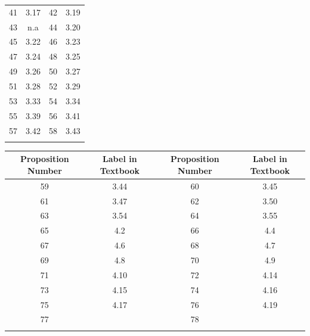 \documentclass{book}
\newenvironment{allowTableDashes}{\ADLactivate}{\ADLinactivate}
\newcommand{\myVS}{\vphantom{$\int_a^b$}}
\begin{document}
\begin{allowTableDashes}
\begin{tabular}{ c|c||c|c }
         \myVS 41 & 3.17 & 42 & 3.19 \\ \hdashline[10pt/3pt]
         \myVS 43 & n.a & 44 & 3.20 \\ \hdashline[10pt/3pt]
         \myVS 45 & 3.22 & 46 & 3.23 \\ \hdashline[10pt/3pt]
         \myVS 47 & 3.24 & 48 & 3.25 \\ \hdashline[10pt/3pt]
         \myVS 49 & 3.26 & 50 & 3.27 \\ \hdashline[10pt/3pt]
         \myVS 51 & 3.28  & 52 & 3.29 \\ \hdashline[10pt/3pt]
         \myVS 53 & 3.33 & 54 & 3.34 \\ \hdashline[10pt/3pt]
         \myVS 55 & 3.39 & 56 & 3.41 \\ \hdashline[10pt/3pt]
         \myVS 57 & 3.42  & 58 & 3.43 \\ \hdashline[10pt/3pt]   
      \end{tabular}

      \newpage

      \begin{tabular}{ c|c||c|c }
         Proposition Number & Label in Textbook & Proposition Number & Label in Textbook \\ \hline
         \myVS 59 & 3.44 & 60 & 3.45 \\ \hdashline[10pt/3pt]
         \myVS 61 & 3.47 & 62 & 3.50 \\ \hdashline[10pt/3pt]
         \myVS 63 & 3.54 & 64 & 3.55 \\ \hdashline[10pt/3pt]
         \myVS 65 & 4.2 & 66 & 4.4 \\ \hdashline[10pt/3pt]
         \myVS 67 & 4.6 & 68 & 4.7 \\ \hdashline[10pt/3pt]
         \myVS 69 & 4.8 & 70 & 4.9 \\ \hdashline[10pt/3pt]
         \myVS 71 & 4.10 & 72 & 4.14  \\ \hdashline[10pt/3pt]
         \myVS 73 & 4.15 & 74 & 4.16 \\ \hdashline[10pt/3pt]
         \myVS 75 & 4.17 & 76 & 4.19 \\ \hdashline[10pt/3pt]
         \myVS 77 &  & 78 &  \\ \hdashline[10pt/3pt]
      \end{tabular}

   \end{allowTableDashes}
\end{document}
